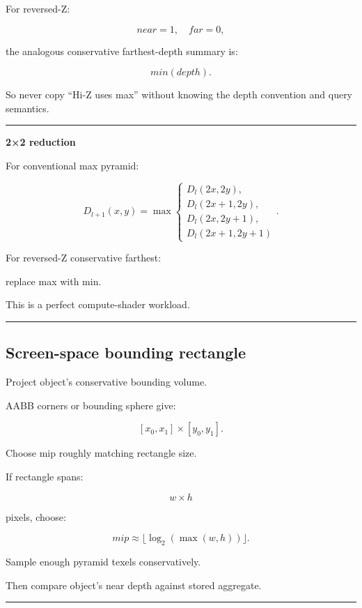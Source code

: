 For reversed-Z:

\[
near=1,\quad far=0,
\]

the analogous conservative farthest-depth summary is:

\[
\boxed{
min(depth).
}
\]

So never copy ``Hi-Z uses max'' without knowing the depth convention and query semantics.

\begin{center}\rule{0.5\linewidth}{0.5pt}\end{center}

\textbf{2×2 reduction}

For conventional max pyramid:

\[
D_{l+1}(x,y)
=
\max
\begin{cases}
D_l(2x,2y),\\
D_l(2x+1,2y),\\
D_l(2x,2y+1),\\
D_l(2x+1,2y+1)
\end{cases}.
\]

For reversed-Z conservative farthest:

replace max with min.

This is a perfect compute-shader workload.

\begin{center}\rule{0.5\linewidth}{0.5pt}\end{center}

\subsection{Screen-space bounding rectangle}\label{04-visual-computing-ii-ch040-screen-space-bounding-rectangle}

Project object's conservative bounding volume.

AABB corners or bounding sphere give:

\[
[x_0,x_1]
\times
[y_0,y_1].
\]

Choose mip roughly matching rectangle size.

If rectangle spans:

\[
w\times h
\]

pixels, choose:

\[
mip\approx
\lfloor\log_2(\max(w,h))\rfloor.
\]

Sample enough pyramid texels conservatively.

Then compare object's near depth against stored aggregate.

\begin{center}\rule{0.5\linewidth}{0.5pt}\end{center}

